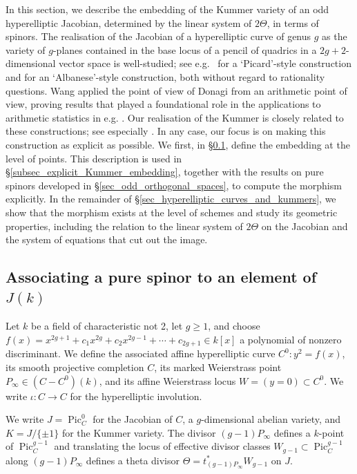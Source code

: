\documentclass{article} %
\numberwithin{equation}{section}
\DeclareMathOperator{\Pic}{Pic}
\begin{document}
In this section, we describe the embedding of the Kummer variety of an odd hyperelliptic Jacobian, determined by the  linear system of $2 \Theta$, in terms of spinors. The realisation of the Jacobian of a hyperelliptic curve of genus $g$ as the variety of $g$-planes contained in the base locus of a pencil of quadrics in a $2g+2$-dimensional vector space is well-studied; see e.g.\ \cite{Des76} for a `Picard'-style construction and \cite{Don80} for an `Albanese'-style construction, both without regard to rationality questions. Wang \cite{Wan18} applied the point of view of Donagi from an arithmetic point of view, proving results that played a foundational role in the applications to arithmetic statistics in e.g. \cite{BhargavaGross}. Our realisation of the Kummer is closely related to these constructions; see especially \cite[\S 4.1]{Rei72}. In any case, our focus is on making this construction as explicit as possible. We first, in \S \ref{subsec_basic_version_keyconstruction}, define the embedding at the level of points. This description is used in \S \ref{subsec_explicit_Kummer_embedding}, together with the results on pure spinors developed in \S \ref{sec_odd_orthogonal_spaces}, to compute the morphism explicitly. In the remainder of \S \ref{sec_hyperelliptic_curves_and_kummers}, we show that the morphism exists at the level of schemes and study its geometric properties, including the relation to the linear system of $2 \Theta$ on the Jacobian and the system of equations that cut out the image. 

\subsection{Associating a pure spinor to an element of $J(k)$}\label{subsec_basic_version_keyconstruction}


Let $k$ be a field of characteristic not 2, let $g \geq 1$, and choose $f(x) = x^{2g+1} + c_1 x^{2g} + c_2x^{2g-1} + \cdots + c_{2g+1}\in k[x]$ a polynomial of nonzero discriminant. We define  the associated affine hyperelliptic curve $C^0 :y^2 =f(x)$, its smooth projective completion $C$, its marked Weierstrass point $P_{\infty} \in (C - C^0)(k)$, and its affine Weierstrass locus $W = (y = 0) \subset C^0$. We write $\iota : C \to C$ for the hyperelliptic involution.

We write $J = \Pic^0_C$ for the Jacobian of $C$, a $g$-dimensional abelian variety, and $K = J / \{ \pm 1 \}$ for the Kummer variety. 
The divisor $(g-1)P_\infty$ defines a $k$-point of $\Pic^{g-1}_ C$ and translating the locus of effective divisor classes $W_{g-1}\subset \Pic_C^{g-1}$ along $(g-1)P_{\infty}$ defines a theta divisor $\Theta = t_{(g-1)P_\infty}^\ast W_{g-1}$ on $J$. 
\end{document}
